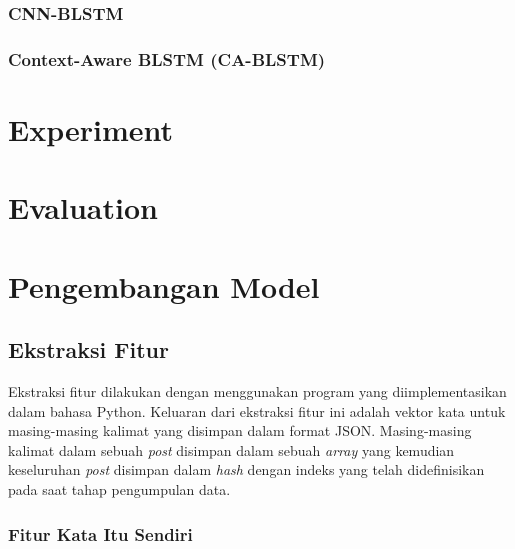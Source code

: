 \subsubsection{CNN-BLSTM}
\subsubsection{Context-Aware BLSTM (CA-BLSTM)}

\section{Experiment}

\section{Evaluation}

\section{Pengembangan Model}
\subsection{Ekstraksi Fitur}
Ekstraksi fitur dilakukan dengan menggunakan program yang diimplementasikan dalam bahasa Python. Keluaran dari ekstraksi fitur ini adalah vektor kata untuk masing-masing kalimat yang disimpan dalam format JSON. Masing-masing kalimat dalam sebuah \textit{post} disimpan dalam sebuah \textit{array} yang kemudian keseluruhan \textit{post} disimpan dalam \textit{hash} dengan indeks yang telah didefinisikan pada saat tahap pengumpulan data.

\subsubsection{Fitur Kata Itu Sendiri}

